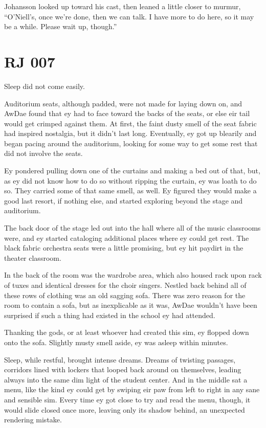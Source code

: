 Johansson looked up toward his cast, then leaned a little closer to murmur, ``O'Niell's, once we're done, then we can talk. I have more to do here, so it may be a while. Please wait up, though.''

\chapter*{RJ 007}

Sleep did not come easily.

Auditorium seats, although padded, were not made for laying down on, and AwDae found that ey had to face toward the backs of the seats, or else eir tail would get crimped against them. At first, the faint dusty smell of the seat fabric had inspired nostalgia, but it didn't last long. Eventually, ey got up blearily and began pacing around the auditorium, looking for some way to get some rest that did not involve the seats.

Ey pondered pulling down one of the curtains and making a bed out of that, but, as ey did not know how to do so without ripping the curtain, ey was loath to do so. They carried some of that same smell, as well. Ey figured they would make a good last resort, if nothing else, and started exploring beyond the stage and auditorium.

The back door of the stage led out into the hall where all of the music classrooms were, and ey started cataloging additional places where ey could get rest. The black fabric orchestra seats were a little promising, but ey hit paydirt in the theater classroom.

In the back of the room was the wardrobe area, which also housed rack upon rack of tuxes and identical dresses for the choir singers. Nestled back behind all of these rows of clothing was an old sagging sofa. There was zero reason for the room to contain a sofa, but as inexplicable as it was, AwDae wouldn't have been surprised if such a thing had existed in the school ey had attended.

Thanking the gods, or at least whoever had created this sim, ey flopped down onto the sofa. Slightly musty smell aside, ey was asleep within minutes.

Sleep, while restful, brought intense dreams. Dreams of twisting passages, corridors lined with lockers that looped back around on themselves, leading always into the same dim light of the student center. And in the middle sat a menu, like the kind ey could get by swiping eir paw from left to right in any sane and sensible sim. Every time ey got close to try and read the menu, though, it would slide closed once more, leaving only its shadow behind, an unexpected rendering mistake.

